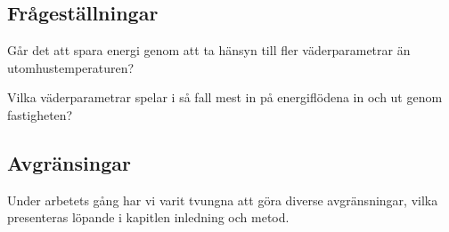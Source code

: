 \subsection{Frågeställningar}
Går det att spara energi genom att ta hänsyn till fler väderparametrar än utomhustemperaturen?

Vilka väderparametrar spelar i så fall mest in på energiflödena in och ut genom fastigheten?

\subsection{Avgränsingar}
Under arbetets gång har vi varit tvungna att göra diverse avgränsningar, vilka presenteras löpande i kapitlen inledning och metod.

